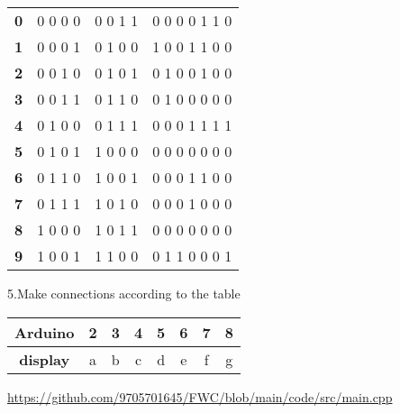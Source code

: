 \documentclass{article}
\begin{document}
\begin{tableofcontents}
\begin{tabular}{|c||c||c||c|}
\hline
\textbf{0} & {0  0  0 0} & {0  0  1 1} & {0 0 0 0 1 1 0}\\
\textbf{1} & {0  0  0 1} & {0  1  0 0} & {1 0 0 1 1 0 0}\\
\textbf{2} & {0  0  1 0} & {0  1  0 1} & {0 1 0 0 1 0 0}\\
\textbf{3} & {0  0  1 1} & {0  1  1 0} & {0 1 0 0 0 0 0}\\
\textbf{4} & {0  1  0 0} & {0  1  1 1} & {0 0 0 1 1 1 1}\\
\textbf{5} & {0  1  0 1} & {1  0  0 0} & {0 0 0 0 0 0 0}\\
\textbf{6} & {0  1  1 0} & {1  0  0 1} & {0 0 0 1 1 0 0}\\
\textbf{7} & {0  1  1 1} & {1  0  1 0} & {0 0 0 1 0 0 0}\\
\textbf{8} & {1  0  0 0} & {1  0  1 1} & {0 0 0 0 0 0 0}\\
\textbf{9} & {1  0  0 1} & {1  1  0 0} & {0 1 1 0 0 0 1}\\
\hline

\end{tabular}
\newline
\newline
5.Make connections according to the table\\
\newline
\begin{tabular}{|c||c||c||c||c||c||c||c|}
\hline
\textbf{Arduino} & 2 & 3 & 4 & 5 & 6 & 7 & 8\\
\hline
\textbf{display} & {a} & {b} & {c} & {d} & {e} & {f} & {g}\\
\hline
\end{tabular}
\newline
\end{tableofcontents}
\newline
\vspace{1cm}
\href{https://github.com/9705701645/FWC/blob/main/code/src/main.cpp}{https://github.com/9705701645/FWC/blob/main/code/src/main.cpp}
\end{document}
